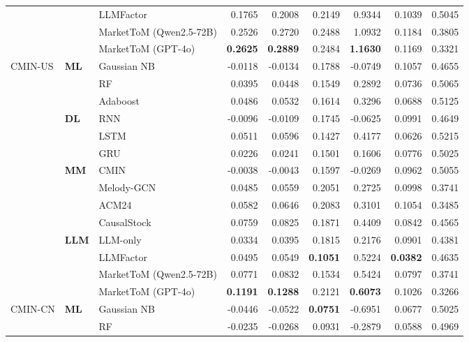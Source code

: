 \documentclass[a4paper,fleqn,doubleblind]{cas-sc}
\begin{document}
{\begin{table}[htbp]
{\begin{tabular}{lllrrrrrr}
 && LLMFactor                & 0.1765 & 0.2008 & 0.2149 & 0.9344 & 0.1039 & 0.5045 \\
 && MarketToM (Qwen2.5-72B)  & 0.2526 & 0.2720 & 0.2488 & 1.0932 & 0.1184 & 0.3805 \\
 && MarketToM (GPT-4o)       & \textbf{0.2625} & \textbf{0.2889} & 0.2484 & \textbf{1.1630} & 0.1169 & 0.3321 \\
\midrule
\multirow{14}{*}{CMIN-US}
 & \multirow{3}{*}{\textbf{ML}}
    & Gaussian NB & -0.0118 & -0.0134 & 0.1788 & -0.0749 & 0.1057 & 0.4655 \\
 && RF           & 0.0395 & 0.0448 & 0.1549 & 0.2892 & 0.0736 & 0.5065 \\
 && Adaboost     & 0.0486 & 0.0532 & 0.1614 & 0.3296 & 0.0688 & 0.5125 \\
\cmidrule(l){2-9}
 & \multirow{3}{*}{\textbf{DL}}
    & RNN  & -0.0096 & -0.0109 & 0.1745 & -0.0625 & 0.0991 & 0.4649 \\
 && LSTM & 0.0511 & 0.0596 & 0.1427 & 0.4177 & 0.0626 & 0.5215 \\
 && GRU  & 0.0226 & 0.0241 & 0.1501 & 0.1606 & 0.0776 & 0.5025 \\
\cmidrule(l){2-9}
 & \multirow{4}{*}{\textbf{MM}}
    & CMIN        & -0.0038 & -0.0043 & 0.1597 & -0.0269 & 0.0962 & 0.5055 \\
 && Melody-GCN  & 0.0485 & 0.0559 & 0.2051 & 0.2725 & 0.0998 & 0.3741 \\
 && ACM24       & 0.0582 & 0.0646 & 0.2083 & 0.3101 & 0.1054 & 0.3485 \\
 && CausalStock & 0.0759 & 0.0825 & 0.1871 & 0.4409 & 0.0842 & 0.4565 \\
\cmidrule(l){2-9}
 & \multirow{4}{*}{\textbf{LLM}}
    & LLM-only                 & 0.0334 & 0.0395 & 0.1815 & 0.2176 & 0.0901 & 0.4381 \\
 && LLMFactor                & 0.0495 & 0.0549 & \textbf{0.1051} & 0.5224 & \textbf{0.0382} & 0.4635 \\
 && MarketToM (Qwen2.5-72B)  & 0.0771 & 0.0832 & 0.1534 & 0.5424 & 0.0797 & 0.3741 \\
 && MarketToM (GPT-4o)       & \textbf{0.1191} & \textbf{0.1288} & 0.2121 & \textbf{0.6073} & 0.1026 & 0.3266 \\
\midrule
\multirow{14}{*}{CMIN-CN}
 & \multirow{3}{*}{\textbf{ML}}
    & Gaussian NB & -0.0446 & -0.0522 & \textbf{0.0751} & -0.6951 & 0.0677 & 0.5025 \\
 && RF           & -0.0235 & -0.0268 & 0.0931 & -0.2879 & 0.0588 & 0.4969 \\

\end{tabular}}
\end{table}}
\end{document}
